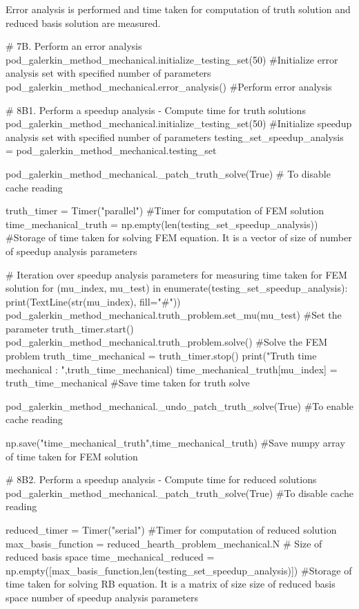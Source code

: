 Error analysis is performed and time taken for computation of truth solution and reduced basis solution are measured.
\begin{python}
# 7B. Perform an error analysis
pod_galerkin_method_mechanical.initialize_testing_set(50) #Initialize error analysis set with specified number of parameters
pod_galerkin_method_mechanical.error_analysis() #Perform error analysis

# 8B1. Perform a speedup analysis - Compute time for truth solutions
pod_galerkin_method_mechanical.initialize_testing_set(50) #Initialize speedup analysis set with specified number of parameters
testing_set_speedup_analysis = pod_galerkin_method_mechanical.testing_set

pod_galerkin_method_mechanical._patch_truth_solve(True) # To disable cache reading

truth_timer = Timer("parallel") #Timer for computation of FEM solution
time_mechanical_truth = np.empty(len(testing_set_speedup_analysis)) #Storage of time taken for solving FEM equation. It is a vector of size of number of speedup analysis parameters

# Iteration over speedup analysis parameters for measuring time taken for FEM solution
for (mu_index, mu_test) in enumerate(testing_set_speedup_analysis):
	print(TextLine(str(mu_index), fill="#"))
	pod_galerkin_method_mechanical.truth_problem.set_mu(mu_test) #Set the parameter
	truth_timer.start()
	pod_galerkin_method_mechanical.truth_problem.solve() #Solve the FEM problem
	truth_time_mechanical = truth_timer.stop()
	print("Truth time mechanical : ",truth_time_mechanical)
	time_mechanical_truth[mu_index] = truth_time_mechanical #Save time taken for truth solve

pod_galerkin_method_mechanical._undo_patch_truth_solve(True) #To enable cache reading

np.save("time_mechanical_truth",time_mechanical_truth) #Save numpy array of time taken for FEM solution

# 8B2. Perform a speedup analysis - Compute time for reduced solutions
pod_galerkin_method_mechanical._patch_truth_solve(True) #To disable cache reading

reduced_timer = Timer("serial") #Timer for computation of reduced solution
max_basis_function = reduced_hearth_problem_mechanical.N # Size of reduced basis space
time_mechanical_reduced = np.empty([max_basis_function,len(testing_set_speedup_analysis)]) #Storage of time taken for solving RB equation. It is a matrix of size size of reduced basis space \times number of speedup analysis parameters


\end{python}
